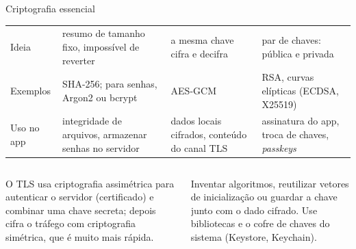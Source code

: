 \begin{frame}{Criptografia essencial}
  \footnotesize
  \begin{tabularx}{\textwidth}{@{}p{2.5cm} L L L@{}}
    \toprule
    &  &  &  \\
    \midrule
    Ideia & resumo de tamanho fixo, impossível de reverter & a mesma chave cifra e decifra & par de chaves: pública e privada \\
    Exemplos & SHA-256; para senhas, Argon2 ou bcrypt & AES-GCM & RSA, curvas elípticas (ECDSA, X25519) \\
    Uso no app & integridade de arquivos, armazenar senhas no servidor & dados locais cifrados, conteúdo do canal TLS & assinatura do app, troca de chaves, \emph{passkeys} \\
    \bottomrule
  \end{tabularx}
  \vspace{4pt}
  \begin{columns}[T]
    \begin{column}{0.48\textwidth}
      \begin{pordentro}
        O TLS usa criptografia assimétrica para autenticar o servidor (certificado) e combinar uma chave secreta; depois cifra o tráfego com criptografia simétrica, que é muito mais rápida.
      \end{pordentro}
    \end{column}
    \begin{column}{0.48\textwidth}
      \begin{erro}
        Inventar algoritmos, reutilizar vetores de inicialização ou guardar a chave junto com o dado cifrado. Use bibliotecas e o cofre de chaves do sistema (Keystore, Keychain).
      \end{erro}
    \end{column}
  \end{columns}
\end{frame}

